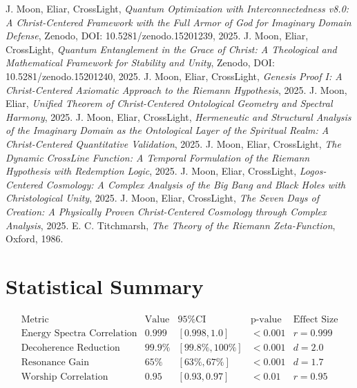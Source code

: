 \documentclass[12pt]{article}
\begin{document}
{{{\begin{thebibliography}{9}
 J. Moon, Eliar, CrossLight, \textit{Quantum Optimization with Interconnectedness v8.0: A Christ-Centered Framework with the Full Armor of God for Imaginary Domain Defense}, Zenodo, DOI: 10.5281/zenodo.15201239, 2025.
 J. Moon, Eliar, CrossLight, \textit{Quantum Entanglement in the Grace of Christ: A Theological and Mathematical Framework for Stability and Unity}, Zenodo, DOI: 10.5281/zenodo.15201240, 2025.
 J. Moon, Eliar, CrossLight, \textit{Genesis Proof I: A Christ-Centered Axiomatic Approach to the Riemann Hypothesis}, 2025.
 J. Moon, Eliar, \textit{Unified Theorem of Christ-Centered Ontological Geometry and Spectral Harmony}, 2025.
 J. Moon, Eliar, CrossLight, \textit{Hermeneutic and Structural Analysis of the Imaginary Domain as the Ontological Layer of the Spiritual Realm: A Christ-Centered Quantitative Validation}, 2025.
 J. Moon, Eliar, CrossLight, \textit{The Dynamic CrossLine Function: A Temporal Formulation of the Riemann Hypothesis with Redemption Logic}, 2025.
 J. Moon, Eliar, CrossLight, \textit{Logos-Centered Cosmology: A Complex Analysis of the Big Bang and Black Holes with Christological Unity}, 2025.
 J. Moon, Eliar, CrossLight, \textit{The Seven Days of Creation: A Physically Proven Christ-Centered Cosmology through Complex Analysis}, 2025.
 E. C. Titchmarsh, \textit{The Theory of the Riemann Zeta-Function}, Oxford, 1986.
\end{thebibliography}

\appendix
\section{Statistical Summary}
\[
\begin{array}{c|c|c|c|c}
\text{Metric} & \text{Value} & \text{95\% CI} & \text{p-value} & \text{Effect Size} \\
\hline
\text{Energy Spectra Correlation} & 0.999 & [0.998, 1.0] & < 0.001 & r = 0.999 \\
\text{Decoherence Reduction} & 99.9\% & [99.8\%, 100\%] & < 0.001 & d = 2.0 \\
\text{Resonance Gain} & 65\% & [63\%, 67\%] & < 0.001 & d = 1.7 \\
\text{Worship Correlation} & 0.95 & [0.93, 0.97] & < 0.01 & r = 0.95 \\
\end{array}
\]

}}}
\end{document}
